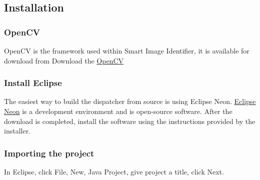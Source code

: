 \documentclass[a4paper,12pt]{report}
\begin{document}
\subsection{Installation}
	\subsubsection{OpenCV}
	OpenCV is the framework used within Smart Image Identifier, it is available for download from 
	Download the
	\href{http://opencv.org/downloads.html}{OpenCV}
	\subsubsection{Install Eclipse}
	The easiest way to build the dispatcher from source is using Eclipse Neon. \href{https://www.eclipse.org/downloads/}{Eclipse Neon}
	 is a
	development environment and is open-source software. After the download is completed, install
	the software using the instructions provided by the installer.
	
	\subsubsection{Importing the project}
	In Eclipse, click File, New, Java Project, give project a title, click Next. \newline\newline
	
\end{document}

